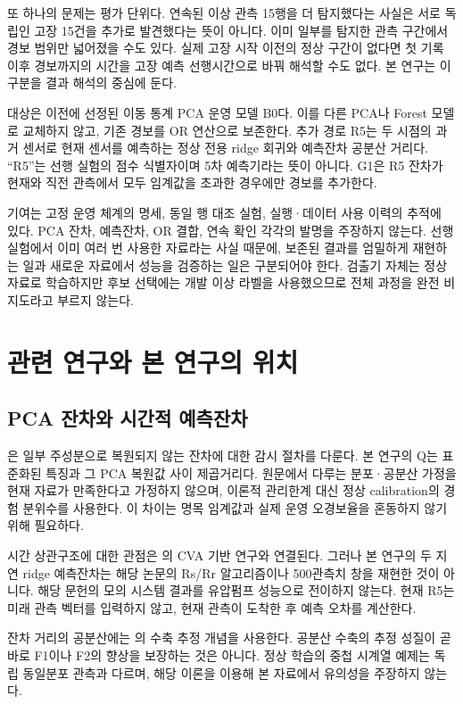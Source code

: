 \documentclass{article}
\begin{document}
또 하나의 문제는 평가 단위다. 연속된 이상 관측 15행을 더 탐지했다는 사실은 서로 독립인 고장 15건을 추가로 발견했다는 뜻이 아니다. 이미 일부를 탐지한 관측 구간에서 경보 범위만 넓어졌을 수도 있다. 실제 고장 시작 이전의 정상 구간이 없다면 첫 기록 이후 경보까지의 시간을 고장 예측 선행시간으로 바꿔 해석할 수도 없다. 본 연구는 이 구분을 결과 해석의 중심에 둔다.

대상은 이전에 선정된 이동 통계 PCA 운영 모델 B0다. 이를 다른 PCA나 Forest 모델로 교체하지 않고, 기존 경보를 OR 연산으로 보존한다. 추가 경로 R5는 두 시점의 과거 센서로 현재 센서를 예측하는 정상 전용 ridge 회귀와 예측잔차 공분산 거리다. ``R5''는 선행 실험의 점수 식별자이며 5차 예측기라는 뜻이 아니다. G1은 R5 잔차가 현재와 직전 관측에서 모두 임계값을 초과한 경우에만 경보를 추가한다.

기여는 고정 운영 체계의 명세, 동일 행 대조 실험, 실행·데이터 사용 이력의 추적에 있다. PCA 잔차, 예측잔차, OR 결합, 연속 확인 각각의 발명을 주장하지 않는다. 선행 실험에서 이미 여러 번 사용한 자료라는 사실 때문에, 보존된 결과를 엄밀하게 재현하는 일과 새로운 자료에서 성능을 검증하는 일은 구분되어야 한다. 검출기 자체는 정상 자료로 학습하지만 후보 선택에는 개발 이상 라벨을 사용했으므로 전체 과정을 완전 비지도라고 부르지 않는다.

\section{관련 연구와 본 연구의 위치}
\subsection{PCA 잔차와 시간적 예측잔차}
\citet{jackson1979}은 일부 주성분으로 복원되지 않는 잔차에 대한 감시 절차를 다룬다. 본 연구의 Q는 표준화된 특징과 그 PCA 복원값 사이 제곱거리다. 원문에서 다루는 분포·공분산 가정을 현재 자료가 만족한다고 가정하지 않으며, 이론적 관리한계 대신 정상 calibration의 경험 분위수를 사용한다. 이 차이는 명목 임계값과 실제 운영 오경보율을 혼동하지 않기 위해 필요하다.

시간 상관구조에 대한 관점은 \citet{jiang2017}의 CVA 기반 연구와 연결된다. 그러나 본 연구의 두 지연 ridge 예측잔차는 해당 논문의 Rs/Rr 알고리즘이나 500관측치 창을 재현한 것이 아니다. 해당 문헌의 모의 시스템 결과를 유압펌프 성능으로 전이하지 않는다. 현재 R5는 미래 관측 벡터를 입력하지 않고, 현재 관측이 도착한 후 예측 오차를 계산한다.

잔차 거리의 공분산에는 \citet{ledoit2004}의 수축 추정 개념을 사용한다. 공분산 수축의 추정 성질이 곧바로 F1이나 F2의 향상을 보장하는 것은 아니다. 정상 학습의 중첩 시계열 예제는 독립 동일분포 관측과 다르며, 해당 이론을 이용해 본 자료에서 유의성을 주장하지 않는다.
\end{document}
